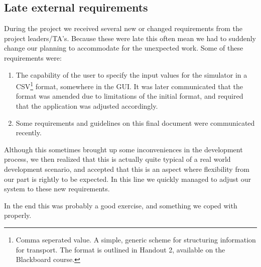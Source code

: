 \subsection{Late external requirements}
\label{late-requirements}
During the project we received several new or changed requirements from the project leaders/TA's. Because these were late this often mean we had to suddenly change our planning to accommodate for the unexpected work. Some of these requirements were:
\begin{enumerate}
\item The capability of the user to specify the input values for the simulator in a CSV\footnote{Comma seperated value. A simple, generic scheme for structuring information for transport. The format is outlined in Handout 2, available on the Blackboard course.} format, somewhere in the GUI. It was later communicated that the format was amended due to limitations of the initial format, and required that the application was adjusted accordingly.
\item Some requirements and guidelines on this final document were communicated recently.
\end{enumerate}

\noindent Although this sometimes brought up some inconveniences in the development process, we then realized that this is actually quite typical of a real world development scenario, and accepted that this is an aspect where flexibility from our part is rightly  to be expected. In this line we quickly managed to adjust our system to these new requirements.

In the end this was probably a good exercise, and something we coped with properly.
